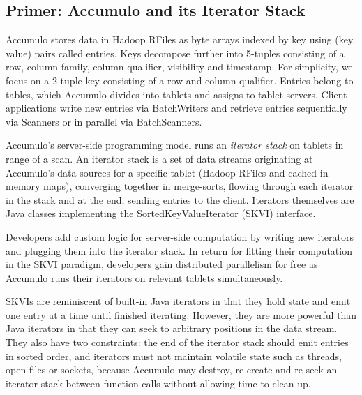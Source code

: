 





\subsection{Primer: Accumulo and its Iterator Stack}
\label{sAccumuloIterators}
Accumulo stores data in Hadoop RFiles as byte arrays indexed by key using (key, value) pairs called entries.
Keys decompose further into 5-tuples consisting of a row, column family, column qualifier, visibility and timestamp.
For simplicity, we focus on a 2-tuple key consisting of a row and column qualifier.
Entries belong to tables, which Accumulo divides into tablets and assigns to tablet servers.
Client applications write new entries via BatchWriters 
and retrieve entries sequentially via Scanners
or in parallel via BatchScanners.

Accumulo's server-side programming model runs an \emph{iterator stack} on tablets in range of a scan.
An iterator stack is a set of data streams originating
at Accumulo's data sources for a specific tablet (Hadoop RFiles and cached in-memory maps), 
converging together in merge-sorts,
flowing through each iterator in the stack and at the end, sending entries to the client.
Iterators themselves are Java classes implementing the SortedKeyValueIterator (SKVI) interface.

Developers add custom logic for server-side computation
by writing new iterators and plugging them into the iterator stack.
In return for fitting their computation in the SKVI paradigm, developers gain
distributed parallelism for free as Accumulo runs their iterators on relevant tablets simultaneously.


SKVIs are reminiscent of built-in Java iterators in that they hold state 
and emit one entry at a time until finished iterating.
However, they are more powerful than Java iterators in that they can seek to arbitrary positions
in the data stream. %
They also have two constraints: 
the end of the iterator stack should emit entries in sorted order,
and iterators must not maintain volatile state such as threads, open files or sockets,
because Accumulo may destroy, re-create and re-seek an iterator stack
between function calls without allowing time to clean up.


